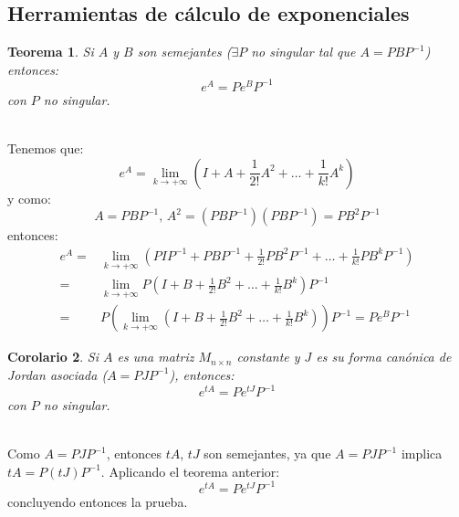 \documentclass[11pt, a4paper,twoside]{article}
\makeatletter
\theoremstyle{theorem-style}  %
\newtheorem{theorem}{Teorema}[section]  %
\newtheorem{corollary}[theorem]{Corolario} %
\renewenvironment{proof}[1][\proofname]{\par
	\pushQED{\qed}%
	\normalfont \topsep6\p@\@plus6\p@\relax
	\list{}{%
		\settowidth{\leftmargin}{\quad:\hskip\labelsep}%
		\setlength{\labelwidth}{0pt}%
		\setlength{\itemindent}{-\leftmargin}%
	}%
	\item[\hskip\labelsep\itshape#1\@addpunct{:}]\ignorespaces
}{%
	\popQED\endlist\@endpefalse
}
\theoremstyle{definition-style}
\theoremstyle{example-style}
\makeatother
\begin{document}
\subsection{Herramientas de cálculo de exponenciales}
\begin{theorem}
	Si $A$ y $B$ son semejantes ($\exists P$ no singular tal que $A = PBP^{-1}$) entonces:
	\[e^A = Pe^BP^{-1}\]
	con $P$ no singular.
\end{theorem}
\begin{proof} \ \\
	Tenemos que:
	\[e^A = \lim\limits_{k \to +\infty} (I + A + \frac{1}{2!}A^2 + \dots + \frac{1}{k!}A^k)\]
	y como:
	\[A = PBP^{-1} \text{, } A^2 = (PBP^{-1})(PBP^{-1}) = PB^2P^{-1}\]
	entonces:
	\begin{align*}
		e^A =& \lim\limits_{k \to +\infty} (PIP^{-1} + PBP^{-1} + \frac{1}{2!}PB^2P^{-1} + \dots + \frac{1}{k!}PB^kP^{-1}) \\
		=& \lim\limits_{k \to +\infty} P(I + B + \frac{1}{2!}B^2 + \dots + \frac{1}{k!}B^k)P^{-1} \\
		=& P(\lim\limits_{k \to +\infty} (I + B + \frac{1}{2!}B^2 + \dots + \frac{1}{k!}B^k))P^{-1} = Pe^BP^{-1}
	\end{align*}
\end{proof}
\begin{corollary}
	Si $A$ es una matriz $M_{n \times n}$ constante y $J$ es su forma canónica de Jordan asociada ($A=PJP^{-1}$), entonces:
	\[e^{tA} = Pe^{tJ}P^{-1}\]
	con $P$ no singular.
\end{corollary}
\begin{proof}\ \\
	Como $A=PJP^{-1}$, entonces $tA$, $tJ$ son semejantes, ya que $A=PJP^{-1}$ implica $tA=P(tJ)P^{-1}$. Aplicando el teorema anterior:
	\[e^{tA} = Pe^{tJ}P^{-1}\]
	concluyendo entonces la prueba.
\end{proof}
\end{document}
